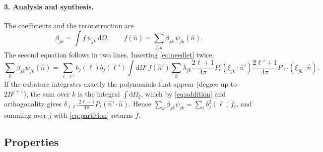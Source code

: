 \documentclass[11pt,a4paper]{article}
\newcommand{\dd}{\mathrm{d}}
\begin{document}
\paragraph{3. Analysis and synthesis.} The coefficients and the reconstruction are
\begin{equation}
  \beta_{jk} = \int f\,\psi_{jk}\,\dd\Omega,\qquad
  f(\hat n) = \sum_{j,k}\beta_{jk}\,\psi_{jk}(\hat n).
  \label{eq:needletsynth}
\end{equation}
The second equation follows in two lines. Inserting \cref{eq:needlet} twice,
\[
  \sum_k\beta_{jk}\psi_{jk}(\hat n) = \sum_{\ell,\ell'}b_j(\ell)b_j(\ell')
  \int\dd\Omega'\,f(\hat n')\sum_k\lambda_{jk}\frac{2\ell+1}{4\pi}P_\ell(\xi_{jk}\cdot\hat n')
  \frac{2\ell'+1}{4\pi}P_{\ell'}(\xi_{jk}\cdot\hat n).
\]
If the cubature integrates exactly the polynomials that appear (degree up to
$2B^{j+1}$), the sum over $k$ is the integral $\int\dd\Omega_\xi$, which by
\cref{eq:addition} and orthogonality gives $\delta_{\ell\ell'}\frac{2\ell+1}{4\pi}
P_\ell(\hat n'\cdot\hat n)$. Hence $\sum_k\beta_{jk}\psi_{jk}=\sum_\ell b_j^2(\ell)f_\ell$,
and summing over $j$ with \cref{eq:partition} returns $f$.

\subsection{Properties}
\end{document}
